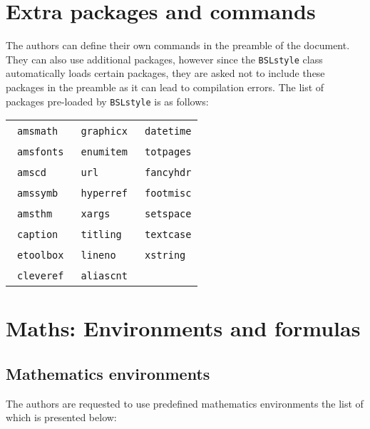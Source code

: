 \documentclass[manuscript]{BSLstyle} %
\begin{document}
\section{Extra packages and commands}

The authors can define their own commands in the preamble of the document. They can also use additional packages, however since the \texttt{BSLstyle} class automatically loads certain packages, they are asked not to include these packages in the preamble as it can lead to compilation errors. The list of packages pre-loaded by \texttt{BSLstyle} is as follows:

\begin{center}
	\bgroup
	\renewcommand*{\arraystretch}{1.5}
	\begin{tabular}{lll}
	\textbullet\ \texttt{amsmath}&\qquad\textbullet\ \texttt{graphicx}&\qquad\textbullet\ \texttt{datetime}\\
	\textbullet\ \texttt{amsfonts}&\qquad\textbullet\ \texttt{enumitem}&\qquad\textbullet\ \texttt{totpages}\\
	\textbullet\ \texttt{amscd}&\qquad\textbullet\ \texttt{url}&\qquad\textbullet\ \texttt{fancyhdr}\\
	\textbullet\ \texttt{amssymb}&\qquad\textbullet\ \texttt{hyperref}&\qquad	\textbullet\ \texttt{footmisc}\\
	\textbullet\ \texttt{amsthm}&\qquad\textbullet\ \texttt{xargs}&\qquad\textbullet\ \texttt{setspace}\\
	\textbullet\ \texttt{caption}&\qquad\textbullet\ \texttt{titling}&\qquad\textbullet\ \texttt{textcase}\\
	\textbullet\ \texttt{etoolbox}&\qquad\textbullet\ \texttt{lineno}&\qquad\textbullet\ \texttt{xstring} \\
	\textbullet\ \texttt{cleveref}&\qquad\textbullet\ \texttt{aliascnt}&
	\end{tabular}
	\egroup
\end{center}


\section{Maths: Environments and formulas}

\subsection{Mathematics environments}

The authors are requested to use predefined mathematics environments the list of which is presented below:
\end{document}
